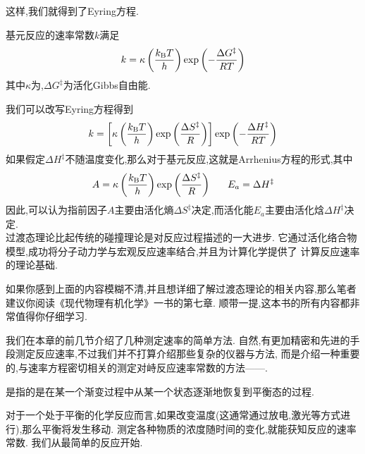 \documentclass{ctexart}
\begin{document}
这样,我们就得到了Eyring方程.
\begin{theorem}[7E.2.6 Eyring方程]
    基元反应的速率常数$k$满足
    \[k=\kappa\left(\dfrac{k_\text BT}{h}\right)\exp\left(-\dfrac{\Delta G^\ddagger}{RT}\right)\]
    其中$\kappa$为,$\Delta G^\ddagger$为活化Gibbs自由能.
\end{theorem}
我们可以改写Eyring方程得到
\[k=\left[\kappa\left(\dfrac{k_\text BT}{h}\right)\exp\left(\dfrac{\Delta S^\ddagger}{R}\right)\right]\exp\left(-\dfrac{\Delta H^\ddagger}{RT}\right)\]
如果假定$\Delta H^\ddagger$不随温度变化,那么对于基元反应,这就是Arrhenius方程的形式,其中
\[A=\kappa\left(\dfrac{k_\text BT}{h}\right)\exp\left(\dfrac{\Delta S^\ddagger}{R}\right)\ \ \ \ \ E_a=\Delta H^\ddagger\]
因此,可以认为指前因子$A$主要由活化熵$\Delta S^\ddagger$决定,而活化能$E_a$主要由活化焓$\Delta H^\ddagger$决定.\\
\indent 过渡态理论比起传统的碰撞理论是对反应过程描述的一大进步.%
它通过活化络合物模型,成功将分子动力学与宏观反应速率结合,并且为计算化学提供了%
计算反应速率的理论基础.
\begin{hint}
    如果你感到上面的内容模糊不清,并且想详细了解过渡态理论的相关内容,那么笔者建议你阅读《现代物理有机化学》一书的第七章.%
    顺带一提,这本书的所有内容都非常值得你仔细学习.
\end{hint}
\vspace{8pt}
\indent 我们在本章的前几节介绍了几种测定速率的简单方法.%
自然,有更加精密和先进的手段测定反应速率,不过我们并不打算介绍那些复杂的仪器与方法,%
而是介绍一种重要的,与速率方程密切相关的测定对峙反应速率常数的方法——.
\begin{definition}[7E.3.1 弛豫]
    是指的是在某一个渐变过程中从某一个状态逐渐地恢复到平衡态的过程.
\end{definition}
对于一个处于平衡的化学反应而言,如果改变温度(这通常通过放电,激光等方式进行),那么平衡将发生移动.%
测定各种物质的浓度随时间的变化,就能获知反应的速率常数.%
我们从最简单的反应开始.
\end{document}
